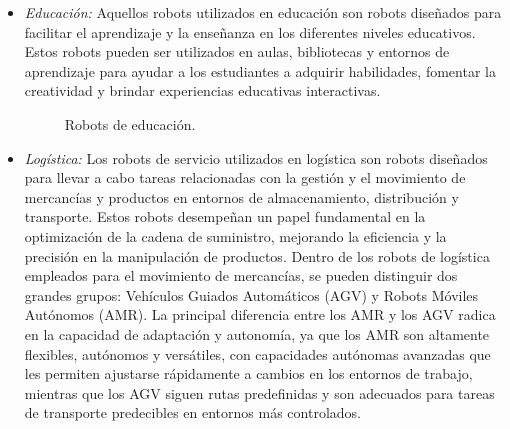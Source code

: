 \begin{itemize}
 \pagebreak
 
 \item \textit{Educación:} Aquellos robots utilizados en educación son robots diseñados para facilitar el aprendizaje y la enseñanza en los diferentes niveles educativos. Estos robots pueden ser utilizados en aulas, bibliotecas y entornos de aprendizaje para ayudar a los estudiantes a adquirir habilidades, fomentar la creatividad y brindar experiencias educativas interactivas.\\
 
 \begin{figure}[h!]
    \begin{center}
      \subcapcentertrue
      \hspace{2mm}
    \end{center}
    \caption{Robots de educación.}
    \label{fig:Robots de educación}
  \end{figure}
 
 \item \textit{Logística:} Los robots de servicio utilizados en logística son robots diseñados para llevar a cabo tareas relacionadas con la gestión y el movimiento de mercancías y productos en entornos de almacenamiento, distribución y transporte. Estos robots desempeñan un papel fundamental en la optimización de la cadena de suministro, mejorando la eficiencia y la precisión en la manipulación de productos. Dentro de los robots de logística empleados para el movimiento de mercancías, se pueden distinguir dos grandes grupos: Vehículos Guiados Automáticos (AGV) y Robots Móviles Autónomos (AMR). La principal diferencia entre los AMR y los AGV radica en la capacidad de adaptación y autonomía, ya que los AMR son altamente flexibles, autónomos y versátiles, con capacidades autónomas avanzadas que les permiten ajustarse rápidamente a cambios en los entornos de trabajo, mientras que los AGV siguen rutas predefinidas y son adecuados para tareas de transporte predecibles en entornos más controlados.
 

\end{itemize}

